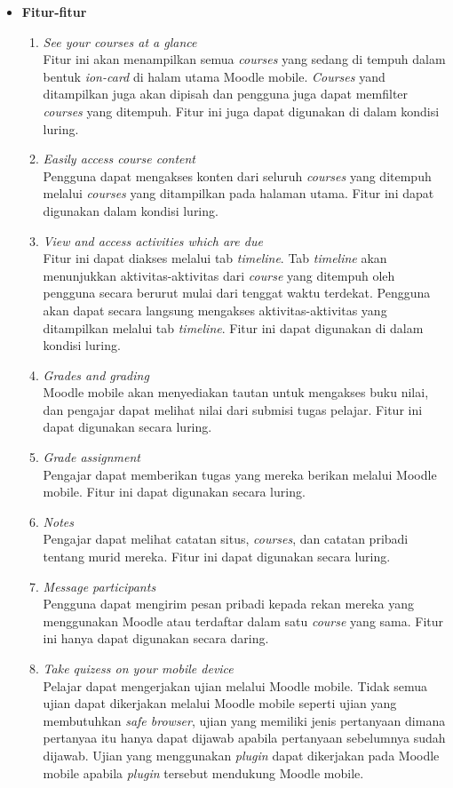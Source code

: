 \documentclass[a4paper,twoside]{article}
\begin{document}
\begin{enumerate}
\begin{itemize}
\item \textbf{Fitur-fitur} \\
\begin{enumerate}
		\item \textit{See your courses at a glance} \\
			Fitur ini akan menampilkan semua \textit{courses} yang sedang di tempuh dalam bentuk \textit{ion-card} di halam utama Moodle mobile. \textit{Courses} yand ditampilkan juga akan dipisah %
			dan pengguna juga dapat memfilter \textit{courses} yang ditempuh. Fitur ini juga dapat digunakan di dalam kondisi luring.
		\item \textit{Easily access course content} \\
			Pengguna dapat mengakses konten dari seluruh \textit{courses} yang ditempuh melalui \textit{courses} yang ditampilkan pada halaman utama. Fitur ini dapat digunakan dalam kondisi luring.
		\item \textit{View and access activities which are due} \\
			Fitur ini dapat diakses melalui tab \textit{timeline}. Tab \textit{timeline} akan menunjukkan aktivitas-aktivitas dari \textit{course} yang ditempuh oleh pengguna secara berurut mulai dari tenggat waktu terdekat. Pengguna akan dapat secara langsung mengakses aktivitas-aktivitas yang ditampilkan melalui tab \textit{timeline}. Fitur ini dapat digunakan di dalam kondisi luring.
		\item \textit{Grades and grading} \\
			Moodle mobile akan menyediakan tautan untuk mengakses buku nilai, dan pengajar dapat melihat nilai dari submisi tugas pelajar. Fitur ini dapat digunakan secara luring.
		\item \textit{Grade assignment} \\
			Pengajar dapat memberikan tugas yang mereka berikan melalui Moodle mobile. Fitur ini dapat digunakan secara luring.
		\item \textit{Notes} \\
			Pengajar dapat melihat catatan situs, \textit{courses}, dan catatan pribadi tentang murid mereka. Fitur ini dapat digunakan secara luring.
		\item \textit{Message participants} \\
			Pengguna dapat mengirim pesan pribadi kepada rekan mereka yang menggunakan Moodle atau terdaftar dalam satu \textit{course} yang sama. Fitur ini hanya dapat digunakan secara daring.
		\item \textit{Take quizess on your mobile device} \\
			Pelajar dapat mengerjakan ujian melalui Moodle mobile. Tidak semua ujian dapat dikerjakan melalui Moodle mobile seperti ujian yang membutuhkan \textit{safe browser}, ujian yang memiliki jenis pertanyaan dimana pertanyaa itu hanya dapat dijawab apabila pertanyaan sebelumnya sudah dijawab. Ujian yang menggunakan \textit{plugin} dapat dikerjakan pada Moodle mobile apabila \textit{plugin} tersebut mendukung Moodle mobile.\cite{moodle:39}
			

\end{enumerate}
\end{itemize}
\end{enumerate}
\end{document}
